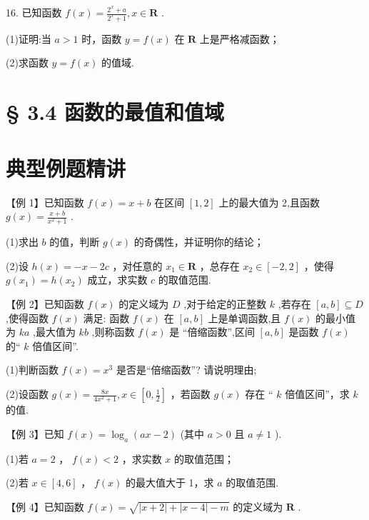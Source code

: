 16. 已知函数 $f\left( x\right)  = \frac{{2}^{x} + a}{{2}^{x} + 1},x \in  \mathbf{R}$ .

(1)证明:当 $a > 1$ 时，函数 $y = f\left( x\right)$ 在 $\mathbf{R}$ 上是严格减函数；

(2)求函数 $y = f\left( x\right)$ 的值域.

\section*{§ 3.4 函数的最值和值域}

\section*{典型例题精讲}

【例 1】已知函数 $f\left( x\right)  = x + b$ 在区间 $\left\lbrack  {1,2}\right\rbrack$ 上的最大值为 2,且函数 $g\left( x\right)  = \frac{x + b}{{x}^{2} + 1}$ .

(1)求出 $b$ 的值，判断 $g\left( x\right)$ 的奇偶性，并证明你的结论；

(2)设 $h\left( x\right)  =  - x - {2c}$ ，对任意的 ${x}_{1} \in  \mathbf{R}$ ，总存在 ${x}_{2} \in  \left\lbrack  {-2,2}\right\rbrack$ ，使得 $g\left( {x}_{1}\right)  = h\left( {x}_{2}\right)$ 成立，求实数 $c$ 的取值范围.

【例 2】已知函数 $f\left( x\right)$ 的定义域为 $D$ ,对于给定的正整数 $k$ ,若存在 $\left\lbrack  {a,b}\right\rbrack   \subseteq  D$ ,使得函数 $f\left( x\right)$ 满足: 函数 $f\left( x\right)$ 在 $\left\lbrack  {a,b}\right\rbrack$ 上是单调函数,且 $f\left( x\right)$ 的最小值为 ${ka}$ ,最大值为 ${kb}$ ,则称函数 $f\left( x\right)$ 是 “倍缩函数”,区间 $\left\lbrack  {a,b}\right\rbrack$ 是函数 $f\left( x\right)$ 的“ $k$ 倍值区间”.

(1)判断函数 $f\left( x\right)  = {x}^{3}$ 是否是“倍缩函数”? 请说明理由;

(2)设函数 $g\left( x\right)  = \frac{8x}{4{x}^{2} + 1},x \in  \left\lbrack  {0,\frac{1}{2}}\right\rbrack$ ，若函数 $g\left( x\right)$ 存在 “ $k$ 倍值区间”，求 $k$ 的值.



【例 3】已知 $f\left( x\right)  = {\log }_{a}\left( {{ax} - 2}\right)$ (其中 $a > 0$ 且 $a \neq  1$ ).

(1)若 $a = 2$ ， $f\left( x\right)  < 2$ ，求实数 $x$ 的取值范围；

(2)若 $x \in  \left\lbrack  {4,6}\right\rbrack$ ， $f\left( x\right)$ 的最大值大于 1，求 $a$ 的取值范围.

【例 4】已知函数 $f\left( x\right)  = \sqrt{\left| {x + 2}\right|  + \left| {x - 4}\right|  - m}$ 的定义域为 $\mathbf{R}$ .

